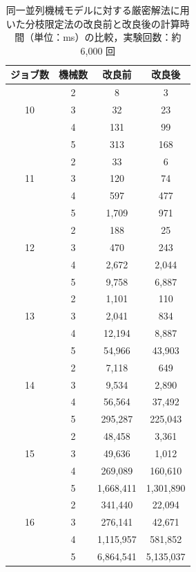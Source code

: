 \documentclass[12pt]{optlab-bachelor}
\begin{document}
\begin{table}[htb]
  \begin{center}
    \begin{tabular}{|c|c|c|c|} \hline
      ジョブ数 & 機械数 & 改良前 & 改良後 \\ \hline \hline
      & 2 & 8 & 3  \\ \cline{2-4}
      10 & 3 & 32 & 23  \\ \cline{2-4}
      & 4 & 131 & 99  \\ \cline{2-4}
      & 5 & 313 & 168  \\ \hline \hline
      & 2 & 33 & 6  \\ \cline{2-4}
      11 & 3 & 120 & 74 \\ \cline{2-4}
      & 4 & 597 & 477  \\ \cline{2-4}
      & 5 & 1,709 & 971  \\ \hline \hline
      & 2 & 188 & 25  \\ \cline{2-4}
      12 & 3 & 470 & 243  \\ \cline{2-4}
      & 4 & 2,672 & 2,044 \\ \cline{2-4}
      & 5 & 9,758 & 6,887   \\ \hline \hline
      & 2 & 1,101 & 110 \\ \cline{2-4}
      13 & 3 & 2,041 & 834 \\ \cline{2-4}
      & 4 & 12,194 & 8,887 \\ \cline{2-4}
      & 5 & 54,966 & 43,903 \\ \hline \hline
      & 2 & 7,118 & 649 \\ \cline{2-4}
      14 & 3 & 9,534 & 2,890 \\ \cline{2-4}
      & 4 & 56,564 & 37,492 \\ \cline{2-4}
      & 5 & 295,287 & 225,043  \\ \hline \hline
      & 2 & 48,458 & 3,361 \\ \cline{2-4}
      15 & 3 & 49,636 & 1,012 \\ \cline{2-4}
      & 4 & 269,089 & 160,610 \\ \cline{2-4}
      & 5 & 1,668,411 & 1,301,890  \\ \hline \hline
      & 2 & 341,440 & 22,094 \\ \cline{2-4}
      16 & 3 & 276,141 & 42,671 \\ \cline{2-4}
      & 4 & 1,115,957 & 581,852 \\ \cline{2-4}
      & 5 & 6,864,541 & 5,135,037  \\ \hline \hline

    \end{tabular}
    \caption{同一並列機械モデルに対する厳密解法に用いた分枝限定法の改良前と改良後の計算時間（単位：ms）の比較，実験回数：約 6,000 回}
    \label{A2}
  \end{center}
\end{table}
\end{document}
